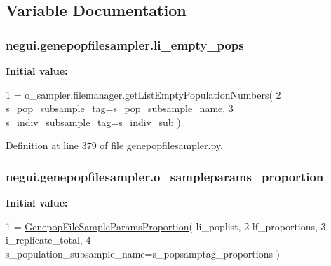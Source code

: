 \subsection{Variable Documentation}
\subsubsection[{\texorpdfstring{li\+\_\+empty\+\_\+pops}{li_empty_pops}}]{\setlength{\rightskip}{0pt plus 5cm}negui.\+genepopfilesampler.\+li\+\_\+empty\+\_\+pops}\hypertarget{namespacenegui_1_1genepopfilesampler_af70a635bca21bb916306ca5d5da4087c}{}\label{namespacenegui_1_1genepopfilesampler_af70a635bca21bb916306ca5d5da4087c}
{\bfseries Initial value\+:}
\begin{DoxyCode}
1 = o\_sampler.filemanager.getListEmptyPopulationNumbers( 
2                     s\_pop\_subsample\_tag=s\_pop\_subsample\_name,
3                     s\_indiv\_subsample\_tag=s\_indiv\_sub  )
\end{DoxyCode}


Definition at line 379 of file genepopfilesampler.\+py.

\subsubsection[{\texorpdfstring{o\+\_\+sampleparams\+\_\+proportion}{o_sampleparams_proportion}}]{\setlength{\rightskip}{0pt plus 5cm}negui.\+genepopfilesampler.\+o\+\_\+sampleparams\+\_\+proportion}\hypertarget{namespacenegui_1_1genepopfilesampler_af2cbb81667dbf55631cb13ca9c97211c}{}\label{namespacenegui_1_1genepopfilesampler_af2cbb81667dbf55631cb13ca9c97211c}
{\bfseries Initial value\+:}
\begin{DoxyCode}
1 = \hyperlink{classnegui_1_1genepopfilesampler_1_1GenepopFileSampleParamsProportion}{GenepopFileSampleParamsProportion}( li\_poplist, 
2                             lf\_proportions, 
3                             i\_replicate\_total, 
4                             s\_population\_subsample\_name=s\_popsamptag\_proportions )
\end{DoxyCode}


